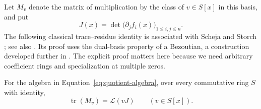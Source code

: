 Let $M_v$ denote the matrix of multiplication by the class of
$v\in S[x]$ in this basis, and put
\begin{equation}\label{eq:jacobian}
 J(x)=\det\bigl(\partial_j f_i(x)\bigr)_{1\le i,j\le n}.
\end{equation}
The following classical trace--residue identity is associated with
Scheja and Storch \cite{SchejaStorch1975}; see also
\cite[Author version, Equation~(4.7)]{CattaniDickensteinSturmfels1996}.
Its proof uses the dual-basis
property of a Bezoutian, a construction developed further in
\cite[Section~3.3]{ElkadiMourrain2005}.  The explicit proof matters here because
we need arbitrary coefficient rings and specialization at multiple
zeros.

\begin{proposition}\label{prop:trace}
For the algebra in Equation~\eqref{eq:quotient-algebra}, over every
commutative ring $S$ with identity,
\begin{equation}\label{eq:trace-formula}
 \operatorname{tr}(M_v)=\mathcal L(vJ)
 \qquad(v\in S[x]).
\end{equation}
\end{proposition}


